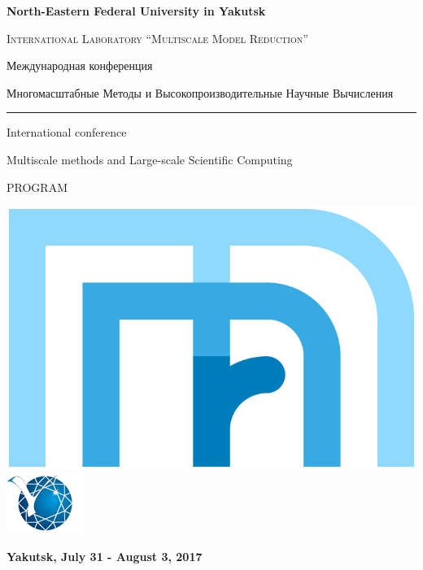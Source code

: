 \begin{titlepage}
\begin{center}
	\bfseries
	\small North-Eastern Federal University in Yakutsk	

	\textsc{\small International Laboratory “Multiscale Model Reduction”}
	\vskip1.0in
	
	Международная конференция
	\medskip
	
  	{\Large Многомасштабные Методы и Высокопроизводительные Научные Вычисления}

	\rule{\textwidth}{2.0pt}
	\vspace{2mm}

	International conference 
	\medskip
	
  	{\Large Multiscale methods and Large-scale Scientific Computing}
  	\vfill
	
	{\LARGE PROGRAM}
\end{center}

	\vfill
	\begin{center}
	\includegraphics[scale=.1]{logoMMR}
	\hspace{8mm}
	\includegraphics[scale=0.6]{logoNEFU}	
	\end{center}
	\vfill
	
\centering
\bfseries
Yakutsk, July 31 - August 3, 2017

\end{titlepage}